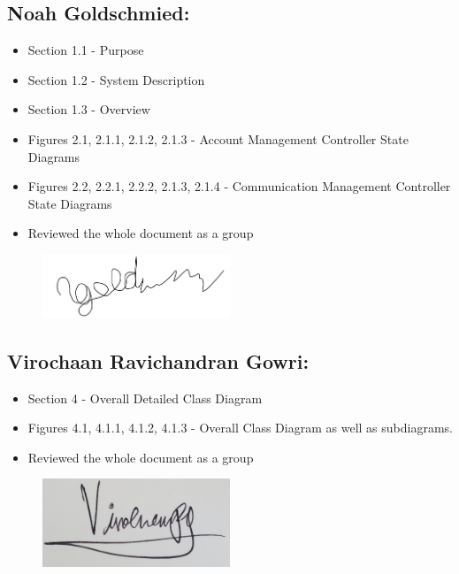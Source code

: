 \documentclass[]{article}
\begin{document}
\subsection*{Noah Goldschmied:}
\begin{itemize}
	\item Section 1.1 - Purpose
	\item Section 1.2 - System Description
	\item Section 1.3 - Overview
	\item Figures 2.1, 2.1.1, 2.1.2, 2.1.3 - Account Management Controller State Diagrams
	\item Figures 2.2, 2.2.1, 2.2.2, 2.1.3, 2.1.4 - Communication Management Controller State Diagrams
	\item Reviewed the whole document as a group
\end{itemize}
\begin{figure}[h]
	\centering
	\includegraphics[width=0.5\textwidth]{../images/NoahSignature.png}
	\label{fig:signature}
\end{figure}
\subsection*{Virochaan Ravichandran Gowri:}
\begin{itemize}
	\item Section 4 - Overall Detailed Class Diagram
	\item Figures 4.1, 4.1.1, 4.1.2, 4.1.3 - Overall Class Diagram as well as subdiagrams.
	\item Reviewed the whole document as a group
\end{itemize}
\begin{figure}[h]
	\centering
	\includegraphics[width=0.5\textwidth]{../images/ViroSignature.jpg}
	\label{fig:signature}
\end{figure}
\end{document}
